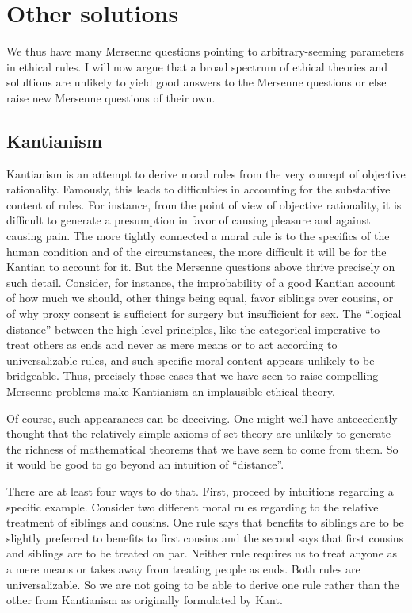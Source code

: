 \section{Other solutions}
We thus have many Mersenne questions pointing to arbitrary-seeming parameters in ethical rules.
I will now argue that a broad spectrum of ethical theories and solultions are unlikely to yield good answers to the Mersenne questions
or else raise new Mersenne questions of their own.

\subsection{Kantianism}
Kantianism is an attempt to derive moral rules from the very concept of objective rationality. Famously, this leads to difficulties in
accounting for the substantive content of rules. For instance, from the point of view of objective rationality, it is difficult
to generate a presumption in favor of causing pleasure and against causing pain. The more tightly connected a moral rule is to the
specifics of the human condition and of the circumstances, the more difficult it will be for the Kantian to account for it. But the Mersenne questions above
thrive precisely on such detail. Consider, for instance, the improbability of a good Kantian account of how much we 
should, other things being equal, favor siblings over cousins, or of why proxy consent is sufficient for surgery but insufficient for
sex. The ``logical distance'' between the high level principles, like the categorical imperative to treat others as ends and never
as mere means or to act according to universalizable rules, and such specific moral content appears unlikely to be bridgeable.
Thus, precisely those cases that we have seen to raise compelling Mersenne problems make Kantianism an implausible ethical theory.

Of course, such appearances can be deceiving. One might well have antecedently thought that the relatively simple axioms of set 
theory are unlikely to generate the richness of mathematical theorems that we have seen to come from them. So it would be good
to go beyond an intuition of ``distance''.

There are at least four ways to do that. First, proceed by intuitions regarding a specific example. Consider two different moral rules regarding to the relative treatment
of siblings and cousins. One rule says that benefits to siblings are to be slightly preferred to benefits to first cousins and the
second says that first cousins and siblings are to be treated on par. Neither rule requires us to treat anyone as a mere means or 
takes away from treating people as ends. Both rules are universalizable. So we are not going to be able to derive one rule rather
than the other from Kantianism as originally formulated by Kant. 

